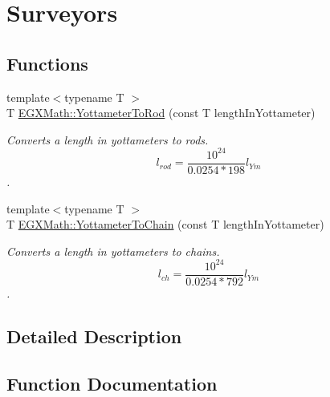 \hypertarget{group___e_g_x_math-_conversions-_length_conversions-_s_i-_yottameter-_surveyors}{}\section{Surveyors}
\label{group___e_g_x_math-_conversions-_length_conversions-_s_i-_yottameter-_surveyors}
\subsection*{Functions}
\begin{DoxyCompactItemize}
\item 
{\footnotesize template$<$typename T $>$ }\\T \mbox{\hyperlink{group___e_g_x_math-_conversions-_length_conversions-_s_i-_yottameter-_surveyors_ga877c3000c23a08dc1bcd3c4359482356}{E\+G\+X\+Math\+::\+Yottameter\+To\+Rod}} (const T length\+In\+Yottameter)
\begin{DoxyCompactList}\small\item\em Converts a length in yottameters to rods. \[ l_{rod}= \frac{10^{24}}{0.0254 * 198} l_{Ym} \]. \end{DoxyCompactList}\item 
{\footnotesize template$<$typename T $>$ }\\T \mbox{\hyperlink{group___e_g_x_math-_conversions-_length_conversions-_s_i-_yottameter-_surveyors_gaac21de73406e1f0b39f48edd2bed4e4f}{E\+G\+X\+Math\+::\+Yottameter\+To\+Chain}} (const T length\+In\+Yottameter)
\begin{DoxyCompactList}\small\item\em Converts a length in yottameters to chains. \[ l_{ch}= \frac{10^{24}}{0.0254 * 792} l_{Ym} \]. \end{DoxyCompactList}\end{DoxyCompactItemize}


\subsection{Detailed Description}


\subsection{Function Documentation}
\mbox{\label{group___e_g_x_math-_conversions-_length_conversions-_s_i-_yottameter-_surveyors_gaac21de73406e1f0b39f48edd2bed4e4f}} 
